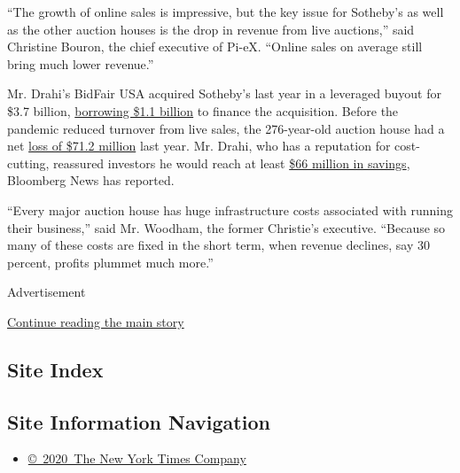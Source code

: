 ``The growth of online sales is impressive, but the key issue for
Sotheby's as well as the other auction houses is the drop in revenue
from live auctions,'' said Christine Bouron, the chief executive of
Pi-eX. ``Online sales on average still bring much lower revenue.''

Mr. Drahi's BidFair USA acquired Sotheby's last year in a leveraged
buyout for \$3.7 billion,
\href{https://www.gazette-drouot.com/article/the-new-sotheby-s-is-coming/11785}{borrowing
\$1.1 billion} to finance the acquisition. Before the pandemic reduced
turnover from live sales, the 276-year-old auction house had a net
\href{https://www.sothebys.com/content/dam/sothebys/PDFs/Sothebys-Annual-Report-12.31.2019.pdf}{loss
of \$71.2 million} last year. Mr. Drahi, who has a reputation for
cost-cutting, reassured investors he would reach at least
\href{https://www.bloomberg.com/news/articles/2019-11-01/billionaire-s-light-touch-approach-at-sotheby-s-faces-first-test}{\$66
million in savings}, Bloomberg News has reported.

``Every major auction house has huge infrastructure costs associated
with running their business,'' said Mr. Woodham, the former Christie's
executive. ``Because so many of these costs are fixed in the short term,
when revenue declines, say 30 percent, profits plummet much more.''

Advertisement

\protect\hyperlink{after-bottom}{Continue reading the main story}

\hypertarget{site-index}{%
\subsection{Site Index}\label{site-index}}

\hypertarget{site-information-navigation}{%
\subsection{Site Information
Navigation}\label{site-information-navigation}}

\begin{itemize}
\tightlist
\item
  \href{https://help.nytimes.com/hc/en-us/articles/115014792127-Copyright-notice}{©~2020~The
  New York Times Company}
\end{itemize}

